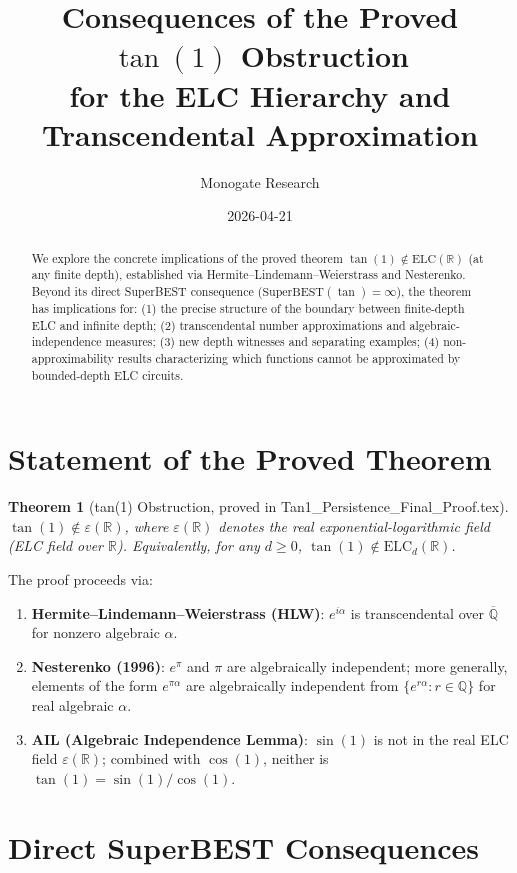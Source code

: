 \documentclass[11pt]{article}
\title{Consequences of the Proved $\tan(1)$ Obstruction\\
for the ELC Hierarchy and Transcendental Approximation}
\author{Monogate Research}
\date{2026-04-21}
\newtheorem{theorem}{Theorem}
\begin{document}
\maketitle

\begin{abstract}
We explore the concrete implications of the proved theorem
$\tan(1)\notin\mathrm{ELC}(\mathbb{R})$ (at any finite depth),
established via Hermite--Lindemann--Weierstrass and Nesterenko.
Beyond its direct SuperBEST consequence ($\mathrm{SuperBEST}(\tan)=\infty$),
the theorem has implications for: (1) the precise structure of the boundary between
finite-depth ELC and infinite depth; (2) transcendental number approximations and
algebraic-independence measures; (3) new depth witnesses and separating examples;
(4) non-approximability results characterizing which functions cannot be approximated
by bounded-depth ELC circuits.
\end{abstract}

\section{Statement of the Proved Theorem}

\begin{theorem}[tan(1) Obstruction, proved in Tan1\_Persistence\_Final\_Proof.tex]
\label{thm:tan1}
$\tan(1)\notin\varepsilon(\mathbb{R})$, where $\varepsilon(\mathbb{R})$ denotes
the real exponential-logarithmic field (ELC field over $\mathbb{R}$).
Equivalently, for any $d\geq0$, $\tan(1)\notin\mathrm{ELC}_d(\mathbb{R})$.
\end{theorem}

The proof proceeds via:
\begin{enumerate}
  \item \textbf{Hermite--Lindemann--Weierstrass (HLW)}: $e^{i\alpha}$ is transcendental over $\overline{\mathbb{Q}}$
    for nonzero algebraic $\alpha$.
  \item \textbf{Nesterenko (1996)}: $e^\pi$ and $\pi$ are algebraically independent;
    more generally, elements of the form $e^{\pi\alpha}$ are algebraically independent
    from $\{e^{r\alpha}:r\in\mathbb{Q}\}$ for real algebraic $\alpha$.
  \item \textbf{AIL (Algebraic Independence Lemma)}: $\sin(1)$ is not in the real ELC field
    $\varepsilon(\mathbb{R})$; combined with $\cos(1)$, neither is $\tan(1)=\sin(1)/\cos(1)$.
\end{enumerate}

\section{Direct SuperBEST Consequences}
\end{document}
